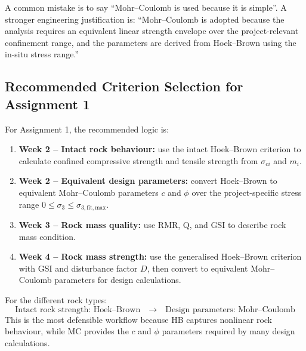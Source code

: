 \documentclass[a4paper,12pt]{article}
\begin{document}
\begin{warnbox}
A common mistake is to say ``Mohr--Coulomb is used because it is simple''. A stronger
engineering justification is: ``Mohr--Coulomb is adopted because the analysis requires an
equivalent linear strength envelope over the project-relevant confinement range, and the
parameters are derived from Hoek--Brown using the in-situ stress range.''
\end{warnbox}

\subsection{Recommended Criterion Selection for Assignment 1}

For Assignment 1, the recommended logic is:

\begin{enumerate}
    \item \textbf{Week 2 -- Intact rock behaviour:}
    use the intact Hoek--Brown criterion to calculate confined compressive strength and
    tensile strength from \(\sigma_{ci}\) and \(m_i\).
    
    \item \textbf{Week 2 -- Equivalent design parameters:}
    convert Hoek--Brown to equivalent Mohr--Coulomb parameters \(c\) and \(\phi\) over
    the project-specific stress range \(0 \leq \sigma_3 \leq \sigma_{3,\mathrm{fit,max}}\).
    
    \item \textbf{Week 3 -- Rock mass quality:}
    use RMR, Q, and GSI to describe rock mass condition.
    
    \item \textbf{Week 4 -- Rock mass strength:}
    use the generalised Hoek--Brown criterion with GSI and disturbance factor \(D\), then
    convert to equivalent Mohr--Coulomb parameters for design calculations.
\end{enumerate}

\begin{keybox}
For the different rock types:
\[
\text{Intact rock strength: Hoek--Brown}
\quad \rightarrow \quad
\text{Design parameters: Mohr--Coulomb}
\]
This is the most defensible workflow because HB captures nonlinear rock behaviour, while
MC provides the \(c\) and \(\phi\) parameters required by many design calculations.
\end{keybox}

\end{document}
